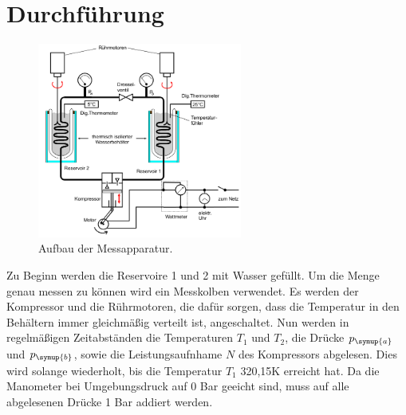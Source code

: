 \section{Durchführung}
\label{sec:Durchführung}
\begin{figure}
  \centering
  \includegraphics[width=0.60\textwidth]{messapparatur.png}
  \caption{Aufbau der Messapparatur\cite{sample}.}
  \label{fig:aufbau}
\end{figure}
Zu Beginn werden die Reservoire 1 und 2 mit Wasser gefüllt. Um die Menge genau
messen zu können wird ein Messkolben verwendet.
Es werden der Kompressor und die Rührmotoren, die dafür sorgen, dass die Temperatur in
den Behältern immer gleichmäßig verteilt ist, angeschaltet.
Nun werden in regelmäßigen Zeitabständen die Temperaturen $T_1$ und $T_2$, die Drücke
$p_\symup{a}$ und $p_\symup{b}$, sowie die Leistungsaufnhame $N$ des Kompressors
abgelesen. Dies wird solange wiederholt, bis die Temperatur $T_1$ 320,15\si{\kelvin}
erreicht hat. Da die Manometer bei Umgebungsdruck auf 0 Bar geeicht sind,
muss auf alle abgelesenen Drücke 1 Bar addiert werden.
